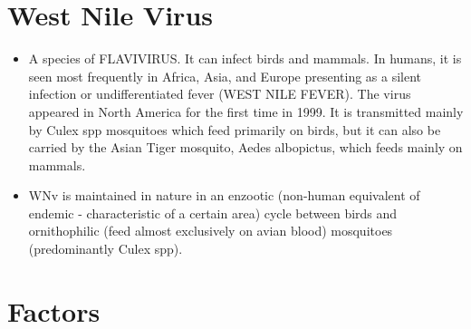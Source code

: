 \documentclass[a4, 12pt]{article}
\begin{document}
\section{West Nile Virus}
\begin{itemize}
\item A species of FLAVIVIRUS. It can infect birds and mammals. In humans, it is seen most frequently in Africa, Asia, and Europe presenting as a silent infection or undifferentiated fever (WEST NILE FEVER). The virus appeared in North America for the first time in 1999. It is transmitted mainly by Culex spp mosquitoes which feed primarily on birds, but it can also be carried by the Asian Tiger mosquito, Aedes albopictus, which feeds mainly on mammals.
\item WNv is maintained in nature in an enzootic (non-human equivalent of endemic - characteristic of a certain area) cycle between birds and ornithophilic (feed almost exclusively on avian blood) mosquitoes (predominantly Culex spp).
\end{itemize}

\section{Factors}
\end{document}
